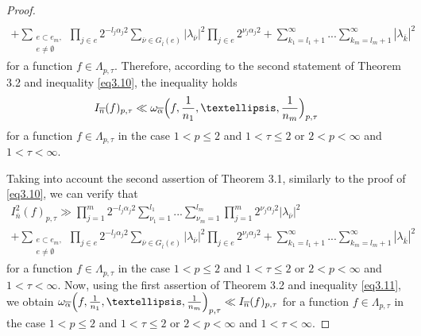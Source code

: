 \documentclass[10pt,a4paper]{amsart}
\begin{document}
\begin{proof}
\begin{multline}
 \\
  + \sum_{\substack{e\subset e_{m},\\ e\neq \emptyset}} \prod_{j\in e}2^{-l_{j}\alpha_{j}2}\sum\limits_{\overline{\nu}\in G_{\overline{l}}(e)}|\lambda_{\overline{\nu}}|^{2}\prod_{j\in e}2^{\nu_{j}\alpha_{j}2}  + \sum\limits_{k_{1}=l_{1}+1}^{\infty}...\sum\limits_{k_{m}=l_{m}+1}^{\infty}|\lambda_{\overline{k}}|^{2}
\end{multline} 
for a function $f \in \Lambda_{p ,\tau}$.  Therefore, according to the second statement of Theorem 3.2 and inequality \eqref{eq3.10}, the inequality holds
 \begin{equation*}
I_{\overline{n}}(f)_{p, \tau} \ll \omega_{\overline\alpha}\Bigl(f,\frac{1}{n_{1}},\ldots, \frac{1}{n_{m}}\Bigr)_{p, \tau}
\end{equation*}
for a function $f \in \Lambda_{p ,\tau}$ in the case 
  $1<p\leqslant 2$ and $1<\tau \leqslant 2$ or $2< p<\infty$ and $1<\tau <\infty$. 
  
Taking into account the second assertion of Theorem 3.1, similarly to the proof of \eqref{eq3.10}, we can verify that
    \begin{multline}\label{eq3.11}
 I_{\overline{n}}^{2}(f)_{p, \tau} \gg \prod_{j=1}^{m}2^{-l_{j}\alpha_{j}2}\sum\limits_{\nu_{1}=1}^{l_{1}}...\sum\limits_{\nu_{m}=1}^{l_{m}}\prod_{j=1}^{m}2^{\nu_{j}\alpha_{j}2}|\lambda_{\overline{\nu}}|^{2}
 \\
  + \sum_{\substack{e\subset e_{m},\\ e\neq \emptyset}} \prod_{j\in e}2^{-l_{j}\alpha_{j}2}\sum\limits_{\overline{\nu}\in G_{\overline{l}}(e)}|\lambda_{\overline{\nu}}|^{2}\prod_{j\in e}2^{\nu_{j}\alpha_{j}2}  + \sum\limits_{k_{1}=l_{1}+1}^{\infty}...\sum\limits_{k_{m}=l_{m}+1}^{\infty}|\lambda_{\overline{k}}|^{2}
\end{multline}
  for a function    $f \in \Lambda_{p ,\tau}$ in the case  
   $1<p\leqslant 2$ and $1<\tau \leqslant 2$ or $2< p<\infty$ and $1<\tau <\infty$.
Now, using the first assertion of Theorem 3.2 and inequality \eqref{eq3.11}, we obtain
$\omega_{\overline\alpha}\Bigl(f,\frac{1}{n_{1}},\ldots, \frac{1}{n_{m}}\Bigr)_{p, \tau}\ll I_{\overline{n}}(f)_{p, \tau}$ 
for a function $f \in \Lambda_{p ,\tau}$ in the case $1<p\leqslant 2$ and $1<\tau \leqslant 2$ or $2< p<\infty$ and $1<\tau <\infty$. 
 \end{proof}
\end{document}
